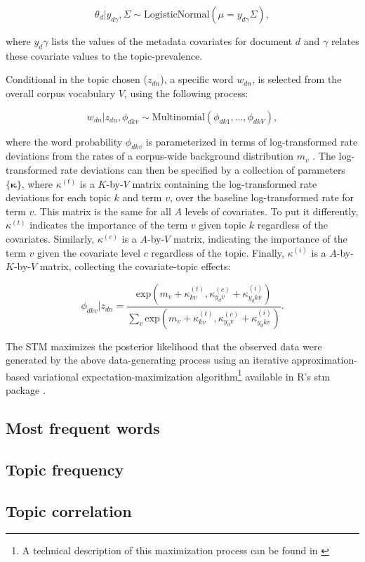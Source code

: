 \documentclass[12pt,a4paper,notitlepage]{article}
\begin{document}
\begin{equation}
	\theta_d|y_{d\gamma},\Sigma \sim \textrm{LogisticNormal}(\mu = y_{d\gamma}\Sigma),
\end{equation}

where $y_d\gamma$ lists the values of the metadata covariates for document $d$ and $\gamma$ relates these covariate values to the topic-prevalence. 

Conditional in the topic chosen ($z_{dn}$), a specific word $w_{dn}$, is selected from the overall corpus vocabulary $V$, using the following process:

\begin{equation}
	w_{dn}|z_{dn},\phi_{dkv} \sim \textrm{Multinomial}(\phi_{dk1},...,\phi_{dkV}),
\end{equation}

where the word probability $\phi_{dkv}$ is parameterized in terms of log-transformed rate deviations from the rates of a corpus-wide background distribution $m_v$ \citep{roberts_structural_2013}. The log-transformed rate deviations can then be specified by a collection of parameters $\lbrace \boldsymbol{\kappa} \rbrace$, where $\kappa^{(t)}$ is a $K$-by-$V$ matrix containing the log-transformed rate deviations for each topic $k$ and term $v$, over the baseline log-transformed rate for term $v$. This matrix is the same for all $A$ levels of covariates. To put it differently, $\kappa^{(t)}$ indicates the importance of the term $v$ given topic $k$ regardless of the covariates. Similarly, $\kappa^{(c)}$ is a $A$-by-$V$ matrix, indicating the importance of the term $v$ given the covariate level $c$ regardless of the topic. Finally, $\kappa^{(i)}$ is a $A$-by-$K$-by-$V$ matrix, collecting the covariate-topic effects:

\begin{equation}
	\phi_{dkv}|z_{dn}=\frac{\textrm{exp}(m_v+\kappa^{(t)}_{kv},\kappa^{(c)}_{y_dv}+\kappa^{(i)}_{y_dkv})}{\sum_v \textrm{exp}(m_v+\kappa^{(t)}_{kv},\kappa^{(c)}_{y_dv}+\kappa^{(i)}_{y_dkv})}.
\end{equation}

The STM maximizes the posterior likelihood that the observed data were generated by the above data-generating process using an iterative approximation-based variational expectation-maximization algorithm\footnote{A technical description of this maximization process can be found in \citet{roberts_model_2016}} available in R's stm package \citep{roberts_stm:_2016}. 

\subsection{Most frequent words}\label{a_labels}



\subsection{Topic frequency}\label{a_proportion}



\subsection{Topic correlation}\label{a_correlation}


\end{document}
